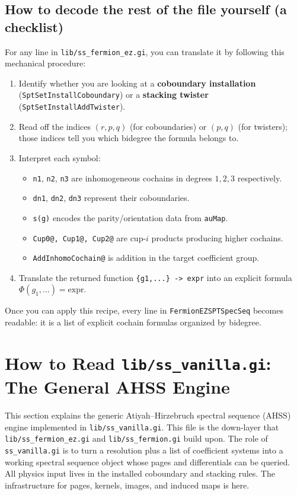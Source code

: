 \documentclass{SciPost}
\begin{document}
\subsection{How to decode the rest of the file yourself (a checklist)}

For any line in \texttt{lib/ss\_fermion\_ez.gi}, you can translate it by following this mechanical procedure:
\begin{enumerate}
    \item Identify whether you are looking at a \textbf{coboundary installation} (\texttt{SptSetInstallCoboundary}) or a \textbf{stacking twister} (\texttt{SptSetInstallAddTwister}).
    \item Read off the indices $(r,p,q)$ (for coboundaries) or $(p,q)$ (for twisters); those indices tell you which bidegree the formula belongs to.
    \item Interpret each symbol:
    \begin{itemize}
        \item \texttt{n1}, \texttt{n2}, \texttt{n3} are inhomogeneous cochains in degrees $1,2,3$ respectively.
        \item \texttt{dn1}, \texttt{dn2}, \texttt{dn3} represent their coboundaries.
        \item \texttt{s(g)} encodes the parity/orientation data from \texttt{auMap}.
        \item \texttt{Cup0@, Cup1@, Cup2@} are cup-$i$ products producing higher cochains.
        \item \texttt{AddInhomoCochain@} is addition in the target coefficient group.
    \end{itemize}
    \item Translate the returned function \texttt{\{g1,...\} -> expr} into an explicit formula $\Phi(g_1,\dots)=\text{expr}$.
\end{enumerate}

Once you can apply this recipe, every line in \texttt{FermionEZSPTSpecSeq} becomes readable: it is a list of explicit cochain formulas organized by bidegree.

\section{How to Read \texttt{lib/ss\_vanilla.gi}: The General AHSS Engine}
\label{sec:ss-vanilla-structure}

This section explains the generic Atiyah--Hirzebruch spectral sequence (AHSS) engine implemented in \texttt{lib/ss\_vanilla.gi}.
This file is the down-layer that \texttt{lib/ss\_fermion\_ez.gi} and \texttt{lib/ss\_fermion.gi} build upon.
The role of \texttt{ss\_vanilla.gi} is to turn a resolution plus a list of coefficient systems into a working spectral sequence object whose pages and differentials can be queried.
All physics input lives in the installed coboundary and stacking rules.
The infrastructure for pages, kernels, images, and induced maps is here.
\end{document}
